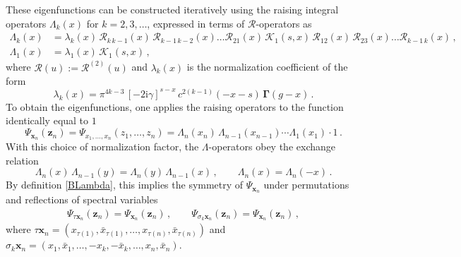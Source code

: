 \documentclass[a4paper,11pt]{article}
\renewcommand{\imath}{\mathrm{i}}
\numberwithin{equation}{section}
\begin{document}
These eigenfunctions can be constructed iteratively using the raising integral operators $\Lambda_k(x)$ for $k=2,3,\ldots$, expressed in terms of $\mathcal{R}$-operators as
\begin{align*}
    \Lambda_k(x) &= \lambda_k(x)\,\mathcal{R}_{k\,k-1}(x)\,
    \mathcal{R}_{k-1\, k-2}(x)
    \ldots \mathcal{R}_{2 1}(x)\,
    \mathcal{K}_1(s,x)\,
    \mathcal{R}_{1 2}(x) \, \mathcal{R}_{2 3}(x) \ldots 
    \mathcal{R}_{k-1\, k}(x)\,, \\ 
    \Lambda_1(x) &= \lambda_1(x)\,\mathcal{K}_1(s,x) \,,
\end{align*} 
where $\mathcal{R}(u):=\mathcal{R}^{(2)}(u)$ and $\lambda_k(x)$ is the normalization coefficient of the form
\begin{equation} \label{nu}
    \lambda_k(x) = \pi^{4k-3}\,[-2\imath\gamma]^{s-x}\,c^{2(k-1)}(-x-s)\,\mathbf{\Gamma}(g-x) \,.
\end{equation}
To obtain the eigenfunctions, one applies the raising operators to the function identically equal to $1$
\begin{equation} \label{BLambda}
    \Psi_{\bm{x}_n}(\bm{z}_n) = \Psi_{x_1, \ldots, x_n}(z_1, \dots, z_n) = 
    \Lambda_n(x_n) \, \Lambda_{n-1}(x_{n-1}) \cdots \Lambda_{1}(x_1) \cdot 1 \,.
\end{equation}  
With this choice of normalization factor, the $\Lambda$-operators obey the exchange relation
\begin{equation*}
    \Lambda_n(x)\,\Lambda_{n-1}(y) =  
    \Lambda_n(y)\,\Lambda_{n-1}(x) \,, \qquad
    \Lambda_n(x) = \Lambda_n(-x) \,.    
\end{equation*} 
By definition \eqref{BLambda}, this implies the symmetry of $\Psi_{\bm{x}_n}$ under permutations and reflections of spectral variables
\begin{align} \nonumber
    \Psi_{\tau \bm{x}_n}(\bm{z}_n) = 
    \Psi_{\bm{x}_n}(\bm{z}_n)\,, \qquad
    \Psi_{\sigma_k \bm{x}_n}(\bm{z}_n) = 
    \Psi_{\bm{x}_n}(\bm{z}_n)\,,
\end{align}
where $\tau \bm{x}_n = (x_{\tau(1)},\bar{x}_{\tau(1)}, \ldots , x_{\tau(n)},\bar{x}_{\tau(n)})$ and $\sigma_k \bm{x}_n = (x_{1},\bar{x}_1,\ldots , -x_{k},-\bar{x}_{k}, \ldots , x_{n},\bar{x}_{n})$.
\end{document}
